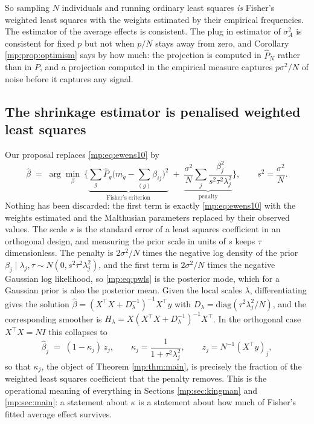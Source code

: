 So sampling $N$ individuals and running ordinary least squares \emph{is} Fisher's weighted
least squares with the weights estimated by their empirical frequencies. The estimator of the
average effects is consistent. The plug in estimator of $\sigma_A^2$ is consistent for fixed $p$ but not when $p/N$ stays away from zero, and Corollary
\ref{mp:prop:optimism} says by how much: the projection is computed in $\hat P_N$ rather than in
$P$, and a projection computed in the empirical measure captures $p\sigma^2/N$ of noise
before it captures any signal.

\subsection{The shrinkage estimator is penalised weighted least squares}

Our proposal replaces \eqref{mp:eq:ewens10} by
\begin{equation}
\hat\beta \;=\; \arg\min_\beta\ \Big\{\underbrace{\sum_g \hat P_g\Big(m_g-\sum_{(g)}\beta_{ij}\Big)^2}_{\text{Fisher's criterion}}
\;+\;\underbrace{\frac{\sigma^2}{N}\sum_{j}\frac{\beta_j^2}{s^2\tau^2\lambda_j^2}}_{\text{penalty}}\Big\} ,
\qquad s^2=\frac{\sigma^2}{N}.
\label{mp:eq:pwls}
\end{equation}
Nothing has been discarded: the first term is exactly \eqref{mp:eq:ewens10} with the weights
estimated and the Malthusian parameters replaced by their observed values. The scale $s$ is
the standard error of a least squares coefficient in an orthogonal design, and measuring
the prior scale in units of $s$ keeps $\tau$ dimensionless. The penalty is $2\sigma^2/N$ times
the negative log density of the prior $\beta_j\mid\lambda_j,\tau\sim N(0,s^2\tau^2\lambda_j^2)$,
and the first term is $2\sigma^2/N$ times the negative Gaussian log likelihood, so
\eqref{mp:eq:pwls} is the posterior mode, which for a Gaussian prior is also the posterior
mean. Given the local scales $\lambda$, differentiating gives the solution
$\hat\beta = (X^\top X + D_\lambda^{-1})^{-1}X^\top y$ with
$D_\lambda=\mathrm{diag}(\tau^2\lambda_j^2/N)$, and the corresponding smoother is
$H_\lambda=X(X^\top X+D_\lambda^{-1})^{-1}X^\top$. In the orthogonal case $X^\top X=NI$ this
collapses to
\begin{equation}
\hat\beta_j \;=\; (1-\kappa_j)\,z_j, \qquad \kappa_j=\frac{1}{1+\tau^2\lambda_j^2},
\qquad z_j = N^{-1}(X^\top y)_j ,
\label{mp:eq:kappaWLS}
\end{equation}
so that $\kappa_j$, the object of Theorem \ref{mp:thm:main}, is precisely the fraction of the
weighted least squares coefficient that the penalty removes. This is the operational meaning
of everything in Sections \ref{mp:sec:kingman} and \ref{mp:sec:main}: a statement about $\kappa$ is
a statement about how much of Fisher's fitted average effect survives.

